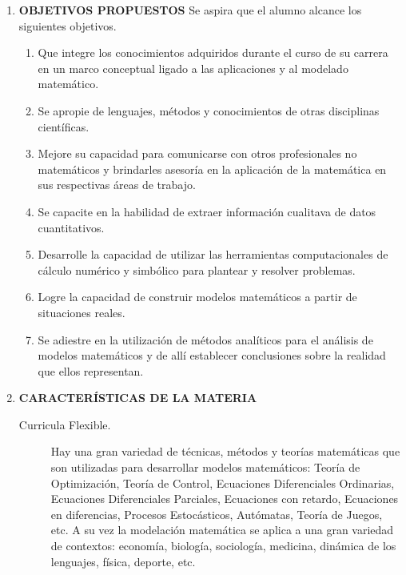 \documentclass[a4paper,10pt,BCOR10mm,oneside,headsepline]{scrbook}
\begin{document}
\begin{enumerate}
 \item \textbf{OBJETIVOS PROPUESTOS}
      Se aspira que el alumno alcance los siguientes objetivos.

      \begin{enumerate}
      
        \item\label{it:1} Que integre los conocimientos adquiridos  durante el curso de su carrera en un marco conceptual ligado a las aplicaciones y al modelado matemático.

        
	\item\label{it:2} Se apropie de lenguajes, métodos y conocimientos de otras disciplinas científicas.

           \item\label{it:3} Mejore su capacidad para comunicarse con otros profesionales no matemáticos y brindarles asesoría en la aplicación de la matemática en sus respectivas áreas de trabajo.

           \item\label{it:4} Se capacite en la habilidad de extraer información cualitava de datos cuantitativos.

           \item\label{it:5} Desarrolle la capacidad de utilizar las herramientas computacionales de cálculo numérico y simbólico para plantear y resolver problemas.
 
	    \item\label{it:6} Logre la capacidad  de construir  modelos matemáticos a partir de situaciones reales.

     
           \item\label{it:8} Se adiestre en la utilización de  métodos analíticos para el análisis de modelos matemáticos y de allí establecer conclusiones sobre la realidad que ellos representan.
           
    
        

          \end{enumerate}


\item \textbf{CARACTERÍSTICAS DE LA MATERIA}

\begin{description}
\item[Curricula Flexible.]  
		Hay una gran variedad de técnicas, métodos y teorías matemáticas que son utilizadas para desarrollar modelos matemáticos: Teoría de Optimización, Teoría de Control, Ecuaciones Diferenciales Ordinarias, Ecuaciones Diferenciales Parciales, Ecuaciones con retardo, Ecuaciones en diferencias, Procesos Estocásticos, Autómatas, Teoría de Juegos, etc. A su vez la modelación matemática se aplica a una gran variedad de contextos: economía, biología, sociología, medicina,  dinámica de los lenguajes, física, deporte, etc. 
		

\end{description}
\end{enumerate}
\end{document}
